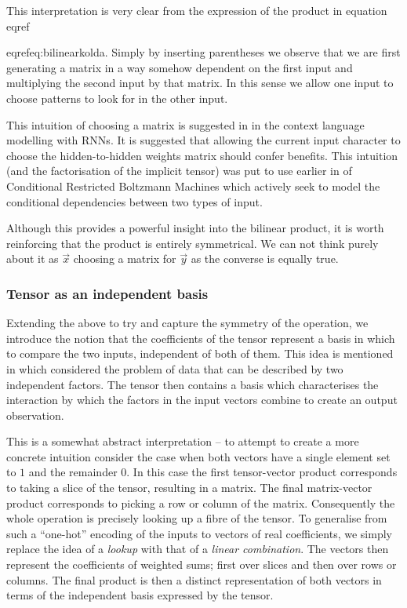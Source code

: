 This interpretation is very clear from the expression of the product in
equation~\\eqref{eqref{eq:bilinearkolda}. Simply by inserting parentheses we observe that we are
first generating a matrix in a way somehow dependent on the first input and multiplying
the second input by that matrix. In this sense we allow one input to choose patterns to look for
in the other input.

This intuition of choosing a matrix is suggested in \autocite{Sutskever2013} in the
context language modelling with RNNs. It is suggested that allowing the current input
character to choose the hidden-to-hidden weights matrix should confer benefits. 
This intuition (and the factorisation of the implicit tensor) was put to use earlier in
of Conditional Restricted Boltzmann Machines \autocite{Taylor} which actively seek to model the
conditional dependencies between two types of input.

Although this provides a powerful insight into the bilinear product, it is worth reinforcing that
the product is entirely symmetrical. We can not think purely about it as \(\vec{x}\) choosing a matrix
for \(\vec{y}\) as the converse is equally true.

\subsubsection{Tensor as an independent basis}
Extending the above to try and capture the symmetry of the operation, we introduce
the notion that the coefficients of the tensor represent a basis in which to compare the
two inputs, independent of both of them. This idea is mentioned in
 \autocite{Tenenbaum2000} which considered the problem of data that can be described by two
independent factors.
The tensor then contains a basis which characterises the interaction by which the factors
in the input vectors combine to create an output observation.

This is a somewhat abstract interpretation -- to attempt to create a more concrete
 intuition
consider the case when both vectors have a single element set to \(1\) and the remainder
\(0\). In this case the first tensor-vector product corresponds to taking a slice of the
tensor, resulting in a matrix. The final matrix-vector product corresponds to picking a
row or column of the matrix. Consequently the whole operation is precisely looking up
a fibre of the tensor. To generalise from such a ``one-hot'' encoding of the inputs
to vectors of real coefficients, we simply replace the idea of a
\emph{lookup} with that of a \emph{linear combination}. The vectors then represent the coefficients
of weighted sums; first over slices and then over rows or columns. The final product is then a
distinct representation of both vectors in terms of the independent basis expressed by the tensor.

}
